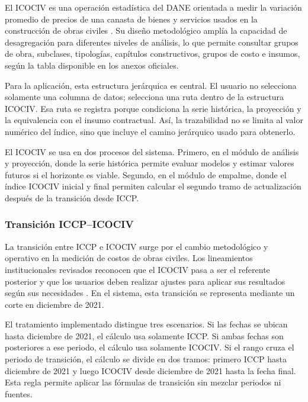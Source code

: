 \documentclass[12pt,letterpaper]{article}
\providecommand{\parencite}{\citep}
\newcommand{\ICOCIV}{ICOCIV}
\newcommand{\ICCP}{ICCP}
\newcommand{\DANE}{DANE}
\begin{document}
El \ICOCIV{} es una operación estadística del \DANE{} orientada a medir la variación promedio de precios de una canasta de bienes y servicios usados en la construcción de obras civiles \parencite{dane_ficha_icociv,dane_metodologia_icociv}. Su diseño metodológico amplía la capacidad de desagregación para diferentes niveles de análisis, lo que permite consultar grupos de obra, subclases, tipologías, capítulos constructivos, grupos de costo e insumos, según la tabla disponible en los anexos oficiales.

Para la aplicación, esta estructura jerárquica es central. El usuario no selecciona solamente una columna de datos; selecciona una ruta dentro de la estructura \ICOCIV. Esa ruta se registra porque condiciona la serie histórica, la proyección y la equivalencia con el insumo contractual. Así, la trazabilidad no se limita al valor numérico del índice, sino que incluye el camino jerárquico usado para obtenerlo.

El \ICOCIV{} se usa en dos procesos del sistema. Primero, en el módulo de análisis y proyección, donde la serie histórica permite evaluar modelos y estimar valores futuros si el horizonte es viable. Segundo, en el módulo de empalme, donde el índice \ICOCIV{} inicial y final permiten calcular el segundo tramo de actualización después de la transición desde \ICCP.

\subsubsection{Transición ICCP--ICOCIV}

La transición entre \ICCP{} e \ICOCIV{} surge por el cambio metodológico y operativo en la medición de costos de obras civiles. Los lineamientos institucionales revisados reconocen que el \ICOCIV{} pasa a ser el referente posterior y que los usuarios deben realizar ajustes para aplicar sus resultados según sus necesidades \parencite{idu_circular_6_2022,invias2022_icociv}. En el sistema, esta transición se representa mediante un corte en diciembre de 2021.

El tratamiento implementado distingue tres escenarios. Si las fechas se ubican hasta diciembre de 2021, el cálculo usa solamente \ICCP. Si ambas fechas son posteriores a ese periodo, el cálculo usa solamente \ICOCIV. Si el rango cruza el periodo de transición, el cálculo se divide en dos tramos: primero \ICCP{} hasta diciembre de 2021 y luego \ICOCIV{} desde diciembre de 2021 hasta la fecha final. Esta regla permite aplicar las fórmulas de transición sin mezclar periodos ni fuentes.
\end{document}
